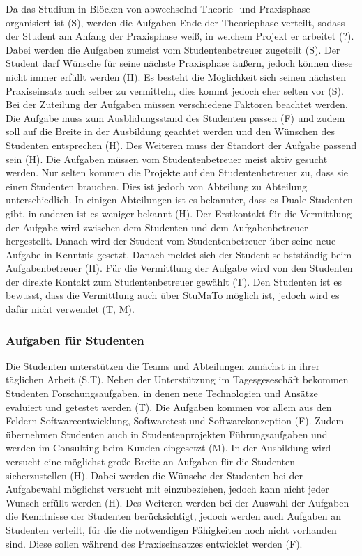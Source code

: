 \documentclass[
  12pt,
  ngerman,
  a4paper,
]{article}
\begin{document}
Da das Studium in Blöcken von abwechselnd Theorie- und Praxisphase
organisiert ist (S), werden die Aufgaben Ende der Theoriephase verteilt,
sodass der Student am Anfang der Praxisphase weiß, in welchem Projekt er
arbeitet (?). Dabei werden die Aufgaben zumeist vom Studentenbetreuer
zugeteilt (S). Der Student darf Wünsche für seine nächste Praxisphase
äußern, jedoch können diese nicht immer erfüllt werden (H). Es besteht
die Möglichkeit sich seinen nächsten Praxiseinsatz auch selber zu
vermitteln, dies kommt jedoch eher selten vor (S). Bei der Zuteilung der
Aufgaben müssen verschiedene Faktoren beachtet werden. Die Aufgabe muss
zum Ausblidungsstand des Studenten passen (F) und zudem soll auf die
Breite in der Ausbildung geachtet werden und den Wünschen des Studenten
entsprechen (H). Des Weiteren muss der Standort der Aufgabe passend sein
(H). Die Aufgaben müssen vom Studentenbetreuer meist aktiv gesucht
werden. Nur selten kommen die Projekte auf den Studentenbetreuer zu,
dass sie einen Studenten brauchen. Dies ist jedoch von Abteilung zu
Abteilung unterschiedlich. In einigen Abteilungen ist es bekannter, dass
es Duale Studenten gibt, in anderen ist es weniger bekannt (H). Der
Erstkontakt für die Vermittlung der Aufgabe wird zwischen dem Studenten
und dem Aufgabenbetreuer hergestellt. Danach wird der Student vom
Studentenbetreuer über seine neue Aufgabe in Kenntnis gesetzt. Danach
meldet sich der Student selbstständig beim Aufgabenbetreuer (H). Für die
Vermittlung der Aufgabe wird von den Studenten der direkte Kontakt zum
Studentenbetreuer gewählt (T). Den Studenten ist es bewusst, dass die
Vermittlung auch über StuMaTo möglich ist, jedoch wird es dafür nicht
verwendet (T, M).

\hypertarget{aufgaben-fuxfcr-studenten}{%
\subsubsection{Aufgaben für Studenten}\label{aufgaben-fuxfcr-studenten}}

Die Studenten unterstützen die Teams und Abteilungen zunächst in ihrer
täglichen Arbeit (S,T). Neben der Unterstützung im Tagesgeseschäft
bekommen Studenten Forschungsaufgaben, in denen neue Technologien und
Ansätze evaluiert und getestet werden (T). Die Aufgaben kommen vor allem
aus den Feldern Softwareentwicklung, Softwaretest und Softwarekonzeption
(F). Zudem übernehmen Studenten auch in Studentenprojekten
Führungsaufgaben und werden im Consulting beim Kunden eingesetzt (M). In
der Ausbildung wird versucht eine möglichst große Breite an Aufgaben für
die Studenten sicherzustellen (H). Dabei werden die Wünsche der
Studenten bei der Aufgabewahl möglichst versucht mit einzubeziehen,
jedoch kann nicht jeder Wunsch erfüllt werden (H). Des Weiteren werden
bei der Auswahl der Aufgaben die Kenntnisse der Studenten
berücksichtigt, jedoch werden auch Aufgaben an Studenten verteilt, für
die die notwendigen Fähigkeiten noch nicht vorhanden sind. Diese sollen
während des Praxiseinsatzes entwicklet werden (F).
\end{document}
